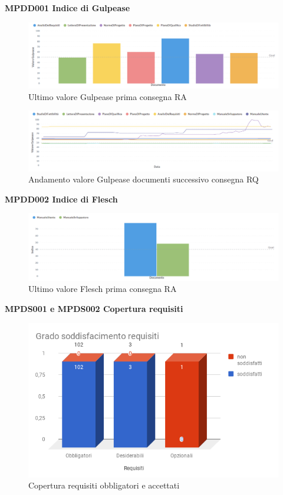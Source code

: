 \documentclass[PianoDiQualifica.tex]{subfiles}
\begin{document}
\textbf{MPDD001 Indice di Gulpease}
\begin{figure}[H]
	\centering
	\includegraphics[width=1\linewidth]{RA/gulpease}
	\caption{Ultimo valore Gulpease prima consegna RA}
	\label{fig:processi}
\end{figure}

\begin{figure}[H]
	\centering
	\includegraphics[width=1\linewidth]{RA/gulpeasegrid}
	\caption{Andamento valore Gulpease documenti successivo consegna RQ}
	\label{fig:processi}
\end{figure}

\textbf{MPDD002 Indice di Flesch}
\begin{figure}[H]
	\centering
	\includegraphics[width=1\linewidth]{RA/flesch}
	\caption{Ultimo valore Flesch prima consegna RA}
	\label{fig:processi}
\end{figure}
\newpage
\textbf{MPDS001 e MPDS002 Copertura requisiti}
\begin{figure}[H]
	\centering
	\includegraphics[width=1\linewidth]{RA/MPDS001-2}
	\caption{Copertura requisiti obbligatori e accettati}
	\label{fig:mpds001-2}
\end{figure}
\end{document}
